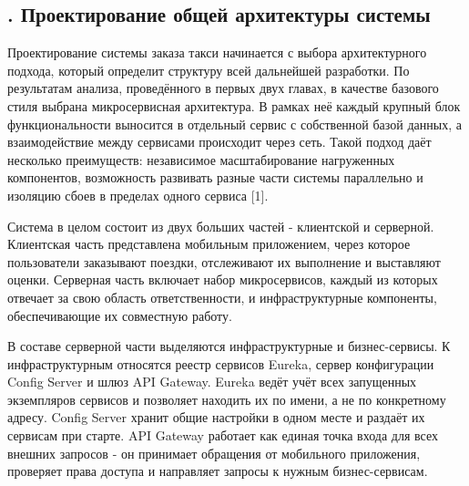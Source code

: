 \setcounter{chaptercntr}{2}


\titlespace

\subsection*{ 
	\gostTitleFont
	\redline
	\thechaptercntr .\thesubchaptercntr \spc
	Проектирование общей архитектуры системы
} \addtocounter{subchaptercntr}{1}

\subtitlespace

{\gostFont
	
	\par \redline Проектирование системы заказа такси начинается с выбора архитектурного подхода, который определит структуру всей дальнейшей разработки. По результатам анализа, проведённого в первых двух главах, в качестве базового стиля выбрана микросервисная архитектура. В рамках неё каждый крупный блок функциональности выносится в отдельный сервис с собственной базой данных, а взаимодействие между сервисами происходит через сеть. Такой подход даёт несколько преимуществ: независимое масштабирование нагруженных компонентов, возможность развивать разные части системы параллельно и изоляцию сбоев в пределах одного сервиса [1].
	
	\par \redline Система в целом состоит из двух больших частей - клиентской и серверной. Клиентская часть представлена мобильным приложением, через которое пользователи заказывают поездки, отслеживают их выполнение и выставляют оценки. Серверная часть включает набор микросервисов, каждый из которых отвечает за свою область ответственности, и инфраструктурные компоненты, обеспечивающие их совместную работу.
	
	\par \redline В составе серверной части выделяются инфраструктурные и бизнес-сервисы. К инфраструктурным относятся реестр сервисов Eureka, сервер конфигурации Config Server и шлюз API Gateway. Eureka ведёт учёт всех запущенных экземпляров сервисов и позволяет находить их по имени, а не по конкретному адресу. Config Server хранит общие настройки в одном месте и раздаёт их сервисам при старте. API Gateway работает как единая точка входа для всех внешних запросов - он принимает обращения от мобильного приложения, проверяет права доступа и направляет запросы к нужным бизнес-сервисам.
	
}
